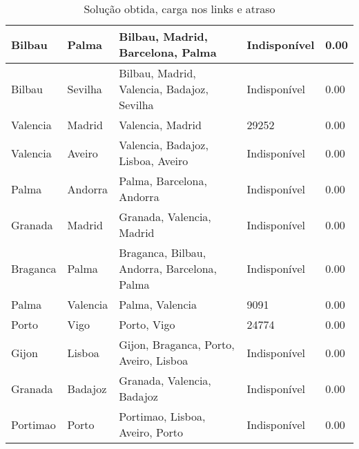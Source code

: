 \begin{table}[!htb]
{\begin{tabular}{|l|l|l|l|l|}
Bilbau & Palma & Bilbau, Madrid, Barcelona, Palma & Indisponível & 0.00 \\ \hline
Bilbau & Sevilha & Bilbau, Madrid, Valencia, Badajoz, Sevilha & Indisponível & 0.00 \\ \hline
Valencia & Madrid & Valencia, Madrid & 29252 & 0.00 \\ \hline
Valencia & Aveiro & Valencia, Badajoz, Lisboa, Aveiro & Indisponível & 0.00 \\ \hline
Palma & Andorra & Palma, Barcelona, Andorra & Indisponível & 0.00 \\ \hline
Granada & Madrid & Granada, Valencia, Madrid & Indisponível & 0.00 \\ \hline
Braganca & Palma & Braganca, Bilbau, Andorra, Barcelona, Palma & Indisponível & 0.00 \\ \hline
Palma & Valencia & Palma, Valencia & 9091 & 0.00 \\ \hline
Porto & Vigo & Porto, Vigo & 24774 & 0.00 \\ \hline
Gijon & Lisboa & Gijon, Braganca, Porto, Aveiro, Lisboa & Indisponível & 0.00 \\ \hline
Granada & Badajoz & Granada, Valencia, Badajoz & Indisponível & 0.00 \\ \hline
Portimao & Porto & Portimao, Lisboa, Aveiro, Porto & Indisponível & 0.00 \\ \hline
\end{tabular}}
\caption[]{Solução obtida, carga nos links e atraso}
\end{table}

